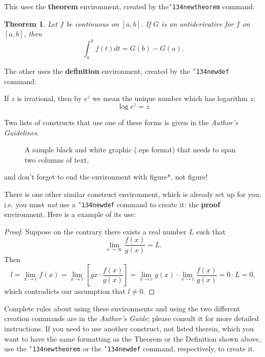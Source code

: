 \documentclass{acm_proc_article-sp}
\begin{document}
This uses the \textbf{theorem} environment, created by
the\linebreak\texttt{{\char'134}newtheorem} command:
\newtheorem{theorem}{Theorem}
\begin{theorem}
Let $f$ be continuous on $[a,b]$.  If $G$ is
an antiderivative for $f$ on $[a,b]$, then
\begin{displaymath}\int^b_af(t)dt = G(b) - G(a).\end{displaymath}
\end{theorem}

The other uses the \textbf{definition} environment, created
by the \texttt{{\char'134}newdef} command:
\begin{definition}
If $z$ is irrational, then by $e^z$ we mean the
unique number which has
logarithm $z$: \begin{displaymath}{\log e^z = z}\end{displaymath}
\end{definition}

Two lists of constructs that use one of these
forms is given in the
\textit{Author's  Guidelines}.

\begin{figure*}
\centering
{}
\caption{A sample black and white graphic (.eps format)
that needs to span two columns of text.}
\end{figure*}
and don't forget to end the environment with
{figure*}, not {figure}!
 
There is one other similar construct environment, which is
already set up
for you; i.e. you must \textit{not} use
a \texttt{{\char'134}newdef} command to
create it: the \textbf{proof} environment.  Here
is a example of its use:
\begin{proof}
Suppose on the contrary there exists a real number $L$ such that
\begin{displaymath}
\lim_{x\rightarrow\infty} \frac{f(x)}{g(x)} = L.
\end{displaymath}
Then
\begin{displaymath}
l=\lim_{x\rightarrow c} f(x)
= \lim_{x\rightarrow c}
\left[ g{x} \cdot \frac{f(x)}{g(x)} \right ]
= \lim_{x\rightarrow c} g(x) \cdot \lim_{x\rightarrow c}
\frac{f(x)}{g(x)} = 0\cdot L = 0,
\end{displaymath}
which contradicts our assumption that $l\neq 0$.
\end{proof}

Complete rules about using these environments and using the
two different creation commands are in the
\textit{Author's Guide}; please consult it for more
detailed instructions.  If you need to use another construct,
not listed therein, which you want to have the same
formatting as the Theorem
or the Definition\cite{salas:calculus} shown above,
use the \texttt{{\char'134}newtheorem} or the
\texttt{{\char'134}newdef} command,
respectively, to create it.
\end{document}
